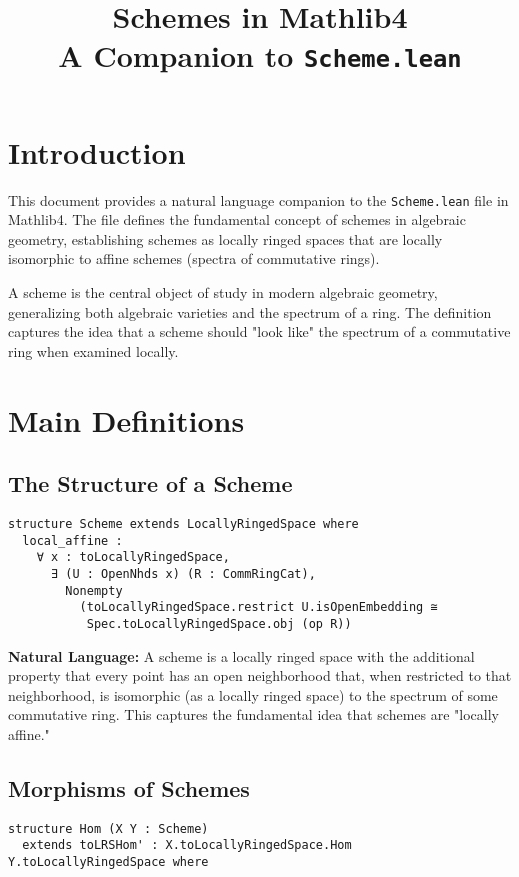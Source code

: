 \documentclass{article}
\title{Schemes in Mathlib4\\
\large A Companion to \texttt{Scheme.lean}}
\author{}
\date{}
\theoremstyle{definition}
\begin{document}
\maketitle

\section{Introduction}

This document provides a natural language companion to the \texttt{Scheme.lean} file in Mathlib4. The file defines the fundamental concept of schemes in algebraic geometry, establishing schemes as locally ringed spaces that are locally isomorphic to affine schemes (spectra of commutative rings).

A scheme is the central object of study in modern algebraic geometry, generalizing both algebraic varieties and the spectrum of a ring. The definition captures the idea that a scheme should "look like" the spectrum of a commutative ring when examined locally.

\section{Main Definitions}

\subsection{The Structure of a Scheme}

\begin{lstlisting}
structure Scheme extends LocallyRingedSpace where
  local_affine :
    ∀ x : toLocallyRingedSpace,
      ∃ (U : OpenNhds x) (R : CommRingCat),
        Nonempty
          (toLocallyRingedSpace.restrict U.isOpenEmbedding ≅
           Spec.toLocallyRingedSpace.obj (op R))
\end{lstlisting}

\textbf{Natural Language:} A scheme is a locally ringed space with the additional property that every point has an open neighborhood that, when restricted to that neighborhood, is isomorphic (as a locally ringed space) to the spectrum of some commutative ring. This captures the fundamental idea that schemes are "locally affine."

\subsection{Morphisms of Schemes}

\begin{lstlisting}
structure Hom (X Y : Scheme)
  extends toLRSHom' : X.toLocallyRingedSpace.Hom Y.toLocallyRingedSpace where
\end{lstlisting}
\end{document}
